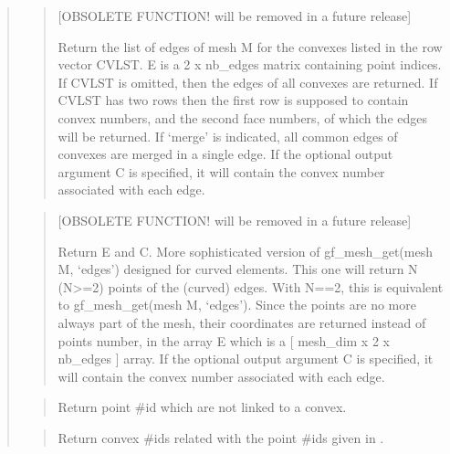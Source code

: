 \documentclass[a4paper,11pt,english]{sphinxmanual}
\begin{document}
\begin{quote}
\begin{quote}

{[}OBSOLETE FUNCTION! will be removed in a future release{]}

Return the list of edges of mesh M for the convexes listed in the
row vector CVLST. E is a 2 x nb\_edges matrix containing point
indices. If CVLST is omitted, then the edges of all convexes are
returned. If CVLST has two rows then the first row is supposed to
contain convex numbers, and the second face numbers, of which the
edges will be returned.  If ‘merge’ is indicated, all common
edges of convexes are merged in a single edge.  If the optional
output argument C is specified, it will contain the convex number
associated with each edge.
\end{quote}

\begin{quote}

{[}OBSOLETE FUNCTION! will be removed in a future release{]}

Return E and C.
More sophisticated version of gf\_mesh\_get(mesh M, ‘edges’) designed for
curved elements. This one will return N (N\textgreater{}=2) points of the
(curved) edges. With N==2, this is equivalent to
gf\_mesh\_get(mesh M, ‘edges’). Since the points are no more always part of
the mesh, their coordinates are returned instead of points
number, in the array E which is a {[} mesh\_dim x 2 x nb\_edges {]}
array.  If the optional output argument C is specified, it will
contain the convex number associated with each edge.
\end{quote}

\begin{quote}

Return point \#id which are not linked to a convex.
\end{quote}

\begin{quote}

Return convex \#ids related with the point \#ids given in .


\end{quote}
\end{quote}
\end{document}
